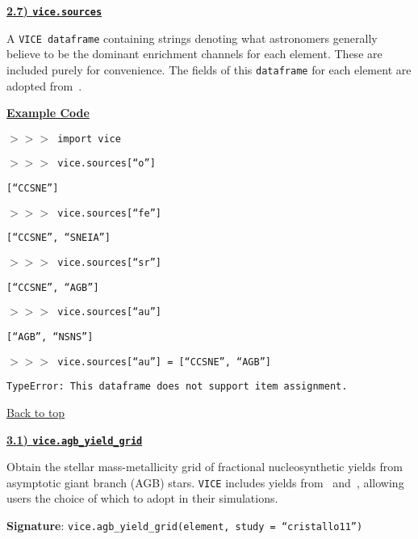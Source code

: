 \documentclass{report}
\begin{document}
\newpage
\noindent 
\begin{center}
\hypertarget{df:sources}{
	\underline{\LARGE
		\textbf{2.7) \texttt{vice.sources}} 
	}
}
\end{center}
A \texttt{VICE dataframe} containing strings denoting what astronomers 
generally believe to be the dominant enrichment channels for each element. 
These are included purely for convenience. The fields of this 
\texttt{dataframe} for each element are adopted from~\citet{Johnson2019}. 
\par\null\par\noindent 
\underline{\textbf{Example Code}} 
\par\noindent 
\texttt{$>>>$ import vice} \par\noindent 
\texttt{$>>>$ vice.sources[``o'']} \par\noindent  
\texttt{[``CCSNE'']} \par\noindent 
\texttt{$>>>$ vice.sources[``fe'']} \par\noindent 
\texttt{[``CCSNE'', ``SNEIA'']} \par\noindent 
\texttt{$>>>$ vice.sources[``sr'']} \par\noindent  
\texttt{[``CCSNE'', ``AGB'']} \par\noindent 
\texttt{$>>>$ vice.sources[``au'']} \par\noindent 
\texttt{[``AGB'', ``NSNS'']} \par\noindent 
\texttt{$>>>$ vice.sources[``au''] = [``CCSNE'', ``AGB'']} \par\noindent 
\texttt{TypeError: This dataframe does not support item assignment.} 
\par\noindent 

\vfill
\hyperlink{top}{Back to top}
\clearpage 

\newpage
\noindent 
\begin{center}
\hypertarget{func:agb_yield_grid}{
	\underline{\LARGE
		\textbf{3.1) \texttt{vice.agb\_yield\_grid}} 
	}
}
\end{center}
\par\noindent 
Obtain the stellar mass-metallicity grid of fractional nucleosynthetic yields 
from asymptotic giant branch (AGB) stars. \texttt{VICE} includes yields 
from~\citet{Karakas2010} and~\citet{Cristallo2011}, allowing users the choice 
of which to adopt in their simulations. 

\par\null\par\noindent
\textbf{Signature}: \texttt{vice.agb\_yield\_grid(element, study = 
``cristallo11'')}
\end{document}
